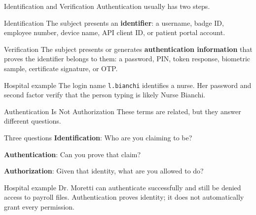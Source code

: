 \documentclass[presentation]{beamer}
\begin{document}
\begin{frame}[c]{Identification and Verification}
  Authentication usually has two steps.

  \begin{block}{Identification}
    The subject presents an \textbf{identifier}: a username, badge ID, employee number, device name, API client ID, or patient portal account.
  \end{block}

  \begin{block}{Verification}
    The subject presents or generates \textbf{authentication information} that proves the identifier belongs to them: a password, PIN, token response, biometric sample, certificate signature, or OTP.
  \end{block}

  \begin{exampleblock}{Hospital example}
    The login name \texttt{l.bianchi} identifies a nurse. Her password and second factor verify that the person typing is likely Nurse Bianchi.
  \end{exampleblock}
\end{frame}

\begin{frame}[c]{Authentication Is Not Authorization}
  These terms are related, but they answer different questions.

  \begin{block}{Three questions}
    \textbf{Identification}: Who are you claiming to be?

    \textbf{Authentication}: Can you prove that claim?

    \textbf{Authorization}: Given that identity, what are you allowed to do?
  \end{block}

  \begin{exampleblock}{Hospital example}
    Dr. Moretti can authenticate successfully and still be denied access to payroll files. Authentication proves identity; it does not automatically grant every permission.
  \end{exampleblock}
\end{frame}
\end{document}
